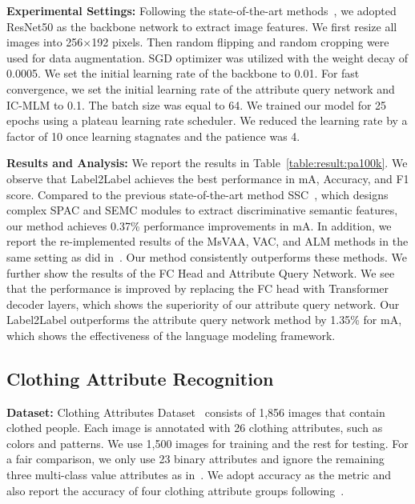 \documentclass[runningheads]{llncs}
\begin{document}
\textbf{Experimental Settings:} Following the  state-of-the-art methods~\cite{jia2021spatial,guo2019visual}, we adopted ResNet50 as the backbone network to extract image features. We first resize all images into 256$\times$192 pixels. Then random flipping and random cropping were used for data augmentation. SGD optimizer was utilized with the weight decay of 0.0005. We set the initial learning rate of the backbone to 0.01. For fast convergence, we set the initial learning rate of the attribute query network and IC-MLM to 0.1. The batch size was equal to 64. We trained our model for 25 epochs using a plateau learning rate scheduler. We reduced the learning rate by a factor of 10 once learning stagnates and the patience was 4. 


\textbf{Results and Analysis:} We report the results in  Table~\ref{table:result:pa100k}. We observe that Label2Label achieves the best performance in mA, Accuracy, and F1 score. Compared to the previous state-of-the-art method SSC~\cite{jia2021spatial}, which designs complex SPAC and SEMC modules to extract discriminative semantic features, our method achieves 0.37\% performance improvements in mA. In addition, we report the re-implemented results of the MsVAA, VAC, and ALM methods in the same setting as did in~\cite{jia2021spatial}. Our method consistently outperforms these methods.
We further show the results of the FC Head and Attribute Query Network. 
We see that the performance is improved by replacing the FC head with Transformer decoder layers, 
which shows the superiority of our attribute query network.
Our Label2Label outperforms the attribute query network method by 1.35\% for mA, which shows the effectiveness of the language modeling framework.



\subsection{Clothing Attribute Recognition}
\textbf{Dataset:} Clothing Attributes Dataset~\cite{chen2012describing} consists of 1,856 images that contain clothed people. Each image is annotated with 26 clothing attributes, such as colors and patterns. We use 1,500 images for training and the rest for testing. For a fair comparison, we only use 23 binary attributes and ignore the remaining three multi-class value attributes as in~\cite{abdulnabi2015multi,meng2018efficient}. We adopt 
accuracy as the metric and also report the accuracy of four clothing attribute groups following~\cite{abdulnabi2015multi,meng2018efficient}.
\end{document}
